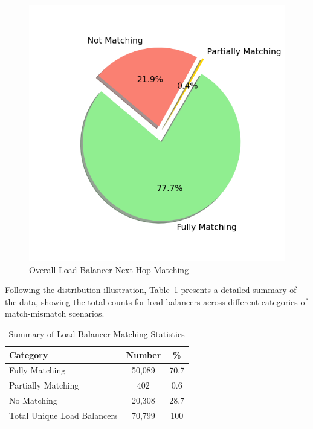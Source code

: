 \documentclass[12pt]{cwru_thesis}
\begin{document}
\begin{figure}[h!]
    \centering
    \includegraphics[scale=0.4]{figures/overall_match_mismatch.png}
    \caption{Overall Load Balancer Next Hop Matching}
    \label{fig:overall_match_mismatch}
\end{figure}

Following the distribution illustration, Table~\ref{tab:summary_data} presents a detailed summary of the data, showing the total counts for load balancers across different categories of match-mismatch scenarios.\\

\begin{table}[h!]
\centering
\begin{tabular}{|l|c|c|}
\hline
\textbf{Category} & \textbf{Number} &\textbf{\%} \\
\hline
Fully Matching & 50,089 & 70.7 \\
Partially Matching & 402 & 0.6 \\
No Matching & 20,308 & 28.7 \\
\hline
Total Unique Load Balancers & 70,799& 100 \\
\hline
\end{tabular}
\caption{Summary of Load Balancer Matching Statistics}
\label{tab:summary_data}
\end{table}
\end{document}
